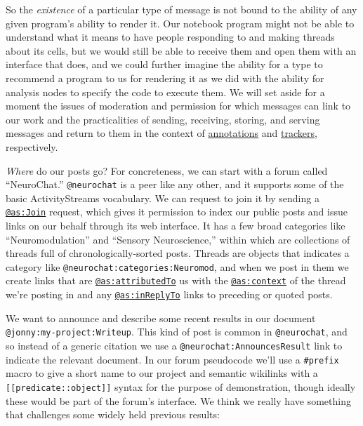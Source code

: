 So the \emph{existence} of a particular type of message is not bound to
the ability of any given program's ability to render it. Our notebook
program might not be able to understand what it means to have people
responding to and making threads about its cells, but we would still be
able to receive them and open them with an interface that does, and we
could further imagine the ability for a type to recommend a program to
us for rendering it as we did with the ability for analysis nodes to
specify the code to execute them. We will set aside for a moment the
issues of moderation and permission for which messages can link to our
work and the practicalities of sending, receiving, storing, and serving
messages and return to them in the context of
\protect\hyperlink{overlays--adversarial-interoperability}{annotations}
and \protect\hyperlink{trackers-clients--wikis}{trackers}, respectively.

\emph{Where} do our posts go? For concreteness, we can start with a
forum called ``NeuroChat.'' \texttt{@neurochat} is a peer like any
other, and it supports some of the basic ActivityStreams vocabulary. We
can request to join it by sending a
\href{https://www.w3.org/TR/activitystreams-vocabulary/\#dfn-join}{\texttt{@as:Join}}
request, which gives it permission to index our public posts and issue
links on our behalf through its web interface. It has a few broad
categories like ``Neuromodulation'' and ``Sensory Neuroscience,'' within
which are collections of threads full of chronologically-sorted posts.
Threads are objects that indicates a category like
\texttt{@neurochat:categories:Neuromod}, and when we post in them we
create links that are
\href{https://www.w3.org/TR/activitystreams-vocabulary/\#dfn-attributedto}{\texttt{@as:attributedTo}}
us with the
\href{https://www.w3.org/TR/activitystreams-vocabulary/\#dfn-context}{\texttt{@as:context}}
of the thread we're posting in and any
\href{https://www.w3.org/TR/activitystreams-vocabulary/\#dfn-inreplyto}{\texttt{@as:inReplyTo}}
links to preceding or quoted posts.

We want to announce and describe some recent results in our document
\texttt{@jonny:my-project:Writeup}. This kind of post is common in
\texttt{@neurochat}, and so instead of a generic citation we use a
\texttt{@neurochat:AnnouncesResult} link to indicate the relevant
document. In our forum pseudocode we'll use a \texttt{\#prefix} macro to
give a short name to our project and semantic wikilinks with a
\texttt{{[}{[}predicate::object{]}{]}} syntax for the purpose of
demonstration, though ideally these would be part of the forum's
interface. We think we really have something that challenges some widely
held previous results:

